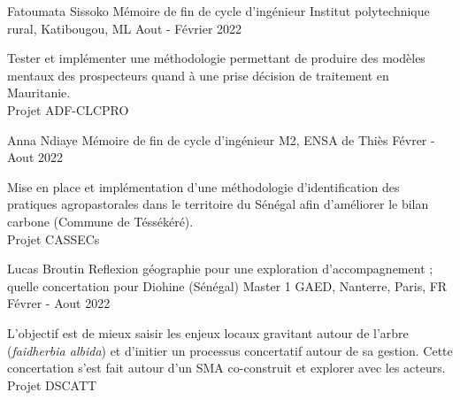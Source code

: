\begin{cventries}
    \cventry
        {Fatoumata Sissoko} %
        {Mémoire de fin de cycle d'ingénieur} %
        {Institut polytechnique rural, Katibougou, ML} %
        {Aout - Février 2022} %
        {
        \begin{cvitems} %
            Tester et implémenter une méthodologie permettant de produire des modèles mentaux des prospecteurs quand à une prise décision de traitement en Mauritanie.\\
            Projet ADF-CLCPRO
        \end{cvitems}
        }


    \cventry
        {Anna Ndiaye} %
        {Mémoire de fin de cycle d'ingénieur} %
        {M2, ENSA de Thiès} %
        {Févrer - Aout 2022} %
        {
        \begin{cvitems} %
            Mise en place et implémentation d'une méthodologie d'identification des pratiques agropastorales dans le territoire du Sénégal afin d’améliorer le bilan carbone (Commune de Téssékéré).\\
            Projet CASSECs
        \end{cvitems}
        }


    \cventry
        {Lucas Broutin} %
        {Reflexion géographie pour une exploration d'accompagnement ; quelle concertation pour Diohine (Sénégal)} %
        {Master 1 GAED, Nanterre, Paris, FR} %
        {Févrer - Aout 2022} %
        {
        \begin{cvitems} %
            L'objectif est de mieux saisir les enjeux locaux gravitant autour de l’arbre (\textit{faidherbia albida}) et d'initier un processus concertatif autour de sa gestion. Cette concertation s'est fait autour d'un SMA co-construit et explorer avec les acteurs.\\
            Projet DSCATT
        \end{cvitems}
        }



\end{cventries}

